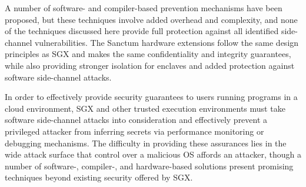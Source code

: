 A number of software- and compiler-based prevention mechanisms have been proposed, but these techniques involve added overhead and complexity, and none of the techniques discussed here provide full protection against all identified side-channel vulnerabilities. The Sanctum hardware extensions follow the same design principles as SGX and makes the same confidentiality and integrity guarantees, while also providing stronger isolation for enclaves and added protection against software side-channel attacks. 

In order to effectively provide security guarantees to users running programs in a cloud environment, SGX and other trusted execution environments must take software side-channel attacks into consideration and effectively prevent a privileged attacker from inferring secrets via performance monitoring or debugging mechanisms. The difficulty in providing these assurances lies in the wide attack surface that control over a malicious OS affords an attacker, though a number of software-, compiler-, and hardware-based solutions present promising techniques beyond existing security offered by SGX. 
